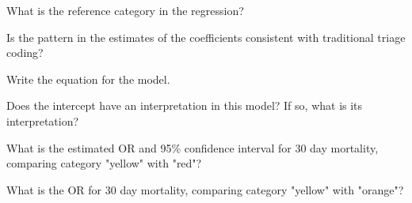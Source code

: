{\begin{parts}
\item What is the reference category in the regression?

\item Is the pattern in the estimates of the coefficients consistent with traditional triage coding?

\item Write the equation for the model.

\item Does the intercept have an interpretation in this model?  If so, what is its interpretation?

\item What is the estimated OR and 95\% confidence interval for 30 day mortality, comparing category "yellow" with "red"?

\item What is the OR for 30 day mortality, comparing category "yellow" with "orange"?

\end{parts}

}{}

